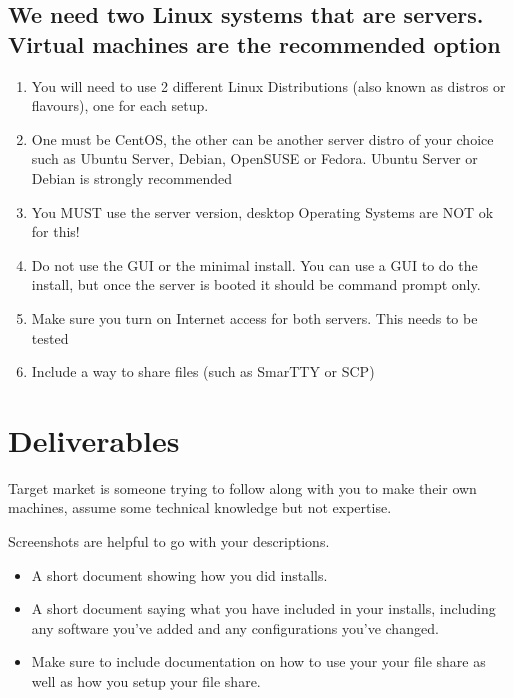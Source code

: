 \documentclass[12pt]{article}
\begin{document}
\subsection*{We need two Linux systems that are servers.  Virtual machines are the recommended option}
    \begin{enumerate}
        \item You will need to use 2 different Linux Distributions (also known as distros or flavours), one for each setup.
        \item One must be CentOS, the other can be another server distro of your choice such as Ubuntu Server, Debian, OpenSUSE or Fedora.  Ubuntu Server or Debian is strongly recommended
        \item You MUST use the server version, desktop Operating Systems  are NOT ok for this! 
        \item Do not use the GUI or the minimal install. You can use a GUI to do the install, but once the server is booted it should be command prompt only.
        \item Make sure you turn on Internet access for both servers.  This needs to be tested
        \item Include a way to share files (such as SmarTTY or SCP)


    \end{enumerate}



\section*{Deliverables}

Target market is someone trying to follow along with you to make their own machines, assume some technical knowledge but not expertise. 

Screenshots are helpful to go with your descriptions.

\begin{itemize}
    \item A short document showing how you did installs.
    \item A short document saying what you have included in your installs, including any software you've added and any configurations you've changed. 
    \item Make sure to include documentation on how to use your your file share as well as how you setup your file share.
\end{itemize}
 
\end{document}
